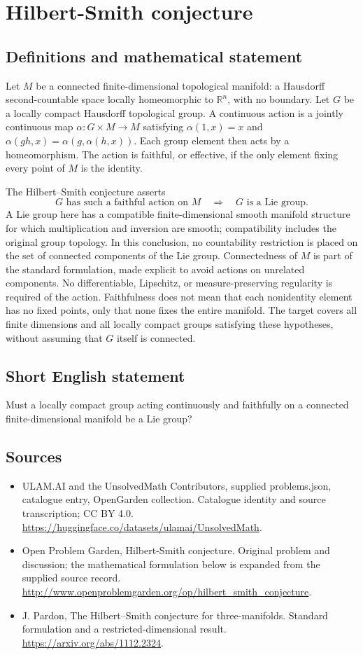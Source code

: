 \documentclass[11pt,a4paper]{article}
\begin{document}
\section*{Hilbert-Smith conjecture}\label{statement}

\subsection{Definitions and mathematical statement}
Let $M$ be a connected finite-dimensional topological manifold:
a Hausdorff second-countable space locally homeomorphic to
$\mathbb R^n$, with no boundary. Let $G$ be a locally compact
Hausdorff topological group. A continuous action is a jointly
continuous map $\alpha:G\times M\to M$ satisfying
$\alpha(1,x)=x$ and $\alpha(gh,x)=\alpha(g,\alpha(h,x))$.
Each group element then acts by a homeomorphism. The action is
faithful, or effective, if the only element fixing every point of
$M$ is the identity.

The Hilbert--Smith conjecture asserts
\[
 G\text{ has such a faithful action on }M
             \quad\Longrightarrow\quad G\text{ is a Lie group}.
\]
A Lie group here has a compatible finite-dimensional smooth
manifold structure for which multiplication and inversion are smooth;
compatibility includes the original group topology. In this conclusion,
no countability restriction is placed on the set of connected components
of the Lie group.
Connectedness of $M$ is part of the standard formulation, made
explicit to avoid actions on unrelated components. No differentiable,
Lipschitz, or measure-preserving regularity is required of the action.
Faithfulness does not mean that each nonidentity element has no
fixed points, only that none fixes the entire manifold. The target
covers all finite dimensions and all locally compact groups satisfying
these hypotheses, without assuming that $G$ itself is connected.
\subsection{Short English statement}
Must a locally compact group acting continuously and faithfully on a connected finite-dimensional manifold be a Lie group?
\subsection{Sources}
\begin{itemize}
\item[S1] ULAM.AI and the UnsolvedMath Contributors, supplied problems.json, catalogue entry, OpenGarden collection. Catalogue identity and source transcription; CC BY 4.0.
\url{https://huggingface.co/datasets/ulamai/UnsolvedMath}.
\item[S2] Open Problem Garden, Hilbert-Smith conjecture. Original problem and discussion; the mathematical formulation below is expanded from the supplied source record.
\url{http://www.openproblemgarden.org/op/hilbert_smith_conjecture}.
\item[S3] J. Pardon, The Hilbert--Smith conjecture for three-manifolds. Standard formulation and a restricted-dimensional result.
\url{https://arxiv.org/abs/1112.2324}.
\end{itemize}
\end{document}
